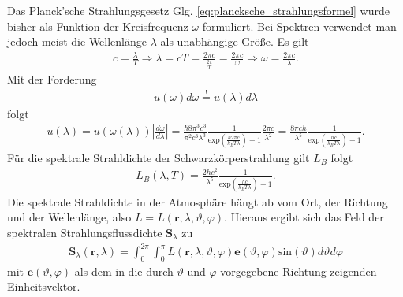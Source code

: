 \documentclass{book}
\newcommand{\hastobe}{\stackrel{!}{=}}
\renewcommand{\exp}{\text{exp}}
\renewcommand{\sin}{\text{sin}}
\begin{document}
Das Planck'sche Strahlungsgesetz Glg. \eqref{eq:plancksche_strahlungsformel} wurde bisher als Funktion der Kreisfrequenz $\omega$ formuliert. Bei Spektren verwendet man jedoch meist die Wellenlänge $\lambda$ als unabhängige Größe. Es gilt
%
\begin{eqnarray}
c = \frac{\lambda}{T}\Rightarrow\lambda = cT = \frac{2\pi c}{\frac{2\pi}{T}} = \frac{2\pi c}{\omega}\Rightarrow\omega = \frac{2\pi c}{\lambda}.
\end{eqnarray}
%
Mit der Forderung
%
\begin{eqnarray}
u\left(\omega\right)d\omega \hastobe u\left(\lambda\right)d\lambda
\end{eqnarray}
%
folgt
%
\begin{eqnarray}
u\left(\lambda\right) = u\left(\omega\left(\lambda\right)\right)\left|\frac{d\omega}{d\lambda}\right| = \frac{\hbar 8\pi^3 c^3}{\pi^2c^3 \lambda^3}\frac{1}{\exp\left(\frac{\hbar 2\pi c}{k_BT\lambda}\right) - 1}\frac{2\pi c}{\lambda^2} = \frac{8\pi ch}{\lambda^5}\frac{1}{\exp\left(\frac{hc}{k_BT\lambda}\right) - 1}.
\end{eqnarray}
%
Für die spektrale Strahldichte der Schwarzkörperstrahlung gilt $L_B$ folgt
%
\begin{eqnarray}
L_B\left(\lambda, T\right) = \frac{2hc^2}{\lambda^5}\frac{1}{\exp\left(\frac{hc}{k_BT\lambda}\right) - 1}.
\end{eqnarray}
%
Die spektrale Strahldichte in der Atmosphäre hängt ab vom Ort, der Richtung und der Wellenlänge, also $L = L\left(\mathbf{r}, \lambda, \vartheta, \varphi\right)$. Hieraus ergibt sich das Feld der spektralen Strahlungsflussdichte $\mathbf{S}_\lambda$ zu
%
\begin{eqnarray}
\mathbf{S}_\lambda\left(\mathbf{r}, \lambda\right) = \int_{0}^{2\pi}\int_{0}^{\pi}L\left(\mathbf{r}, \lambda, \vartheta, \varphi\right)\mathbf{e}\left(\vartheta, \varphi\right)\sin\left(\vartheta\right)d\vartheta d\varphi
\end{eqnarray}
%
mit $\mathbf{e}\left(\vartheta, \varphi\right)$ als dem in die durch $\vartheta$ und $\varphi$ vorgegebene Richtung zeigenden Einheitsvektor.
\end{document}
